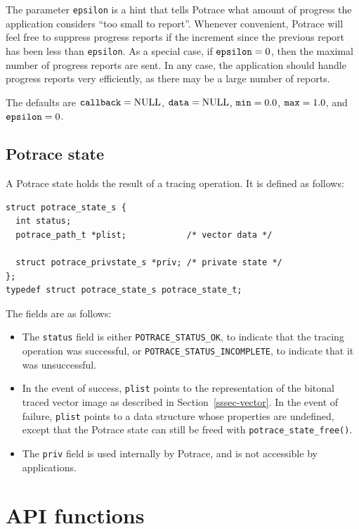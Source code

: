 \documentclass{article}
\begin{document}
The parameter \verb!epsilon! is a hint that tells Potrace what amount of
progress the application considers ``too small to report''. Whenever
convenient, Potrace will feel free to suppress progress reports if the
increment since the previous report has been less than \verb!epsilon!.  As
a special case, if $\verb!epsilon!=0$, then the maximal number of progress
reports are sent. In any case, the application should handle progress
reports very efficiently, as there may be a large number of reports. 

The defaults are $\verb!callback!=\textrm{NULL}$,
$\verb!data!=\textrm{NULL}$, $\verb!min!=0.0$, $\verb!max!=1.0$, and
$\verb!epsilon!=0$.

\subsection{Potrace state}\label{4}

A Potrace state holds the result of a tracing operation. It is
defined as follows:

\begin{verbatim}
struct potrace_state_s {
  int status;
  potrace_path_t *plist;            /* vector data */

  struct potrace_privstate_s *priv; /* private state */
};
typedef struct potrace_state_s potrace_state_t;
\end{verbatim}

The fields are as follows:
\begin{itemize}
\item The \verb!status! field is either \verb!POTRACE_STATUS_OK!, to
  indicate that the tracing operation was successful, or
  \verb!POTRACE_STATUS_INCOMPLETE!, to indicate that it was
  unsuccessful.
\item In the event of success, \verb!plist! points to the
  representation of the bitonal traced vector image as described in
  Section~\ref{sssec-vector}.  In the event of failure, \verb!plist!
  points to a data structure whose properties are undefined, except
  that the Potrace state can still be freed with \verb!potrace_state_free()!.
\item The \verb!priv! field is used internally by Potrace, and is not
  accessible by applications.
\end{itemize}

\section{API functions}\label{5}
\end{document}
